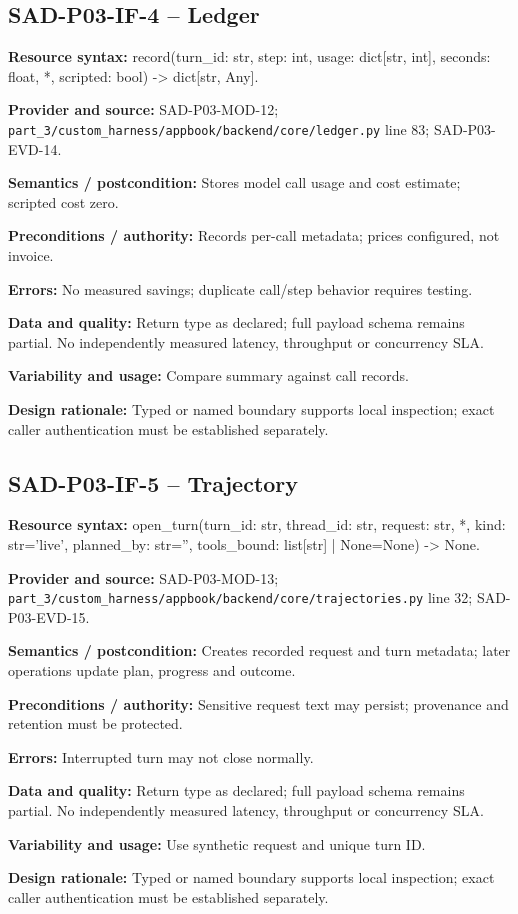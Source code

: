 \documentclass[10pt,letterpaper]{article}
\begin{document}
\subsection{SAD-P03-IF-4 -- Ledger}
{\raggedright \textbf{Resource syntax:} record(\allowbreak{}turn\_\allowbreak{}id: str, step: int, usage: dict[str, int], seconds: float, *, scripted: bool) -> dict[str, Any].\par}
\textbf{Provider and source:} SAD-P03-MOD-12; \nolinkurl{part_3/custom_harness/appbook/backend/core/ledger.py} line 83; SAD-P03-EVD-14.\par
\textbf{Semantics / postcondition:} Stores model call usage and cost estimate; scripted cost zero.\par
\textbf{Preconditions / authority:} Records per-call metadata; prices configured, not invoice.\par
\textbf{Errors:} No measured savings; duplicate call/step behavior requires testing.\par
\textbf{Data and quality:} Return type as declared; full payload schema remains partial. No independently measured latency, throughput or concurrency SLA.\par
\textbf{Variability and usage:} Compare summary against call records.\par
\textbf{Design rationale:} Typed or named boundary supports local inspection; exact caller authentication must be established separately.\par

\subsection{SAD-P03-IF-5 -- Trajectory}
{\raggedright \textbf{Resource syntax:} open\_\allowbreak{}turn(\allowbreak{}turn\_\allowbreak{}id: str, thread\_\allowbreak{}id: str, request: str, *, kind: str='live', planned\_\allowbreak{}by: str='', tools\_\allowbreak{}bound: list[str] | None=None) -> None.\par}
\textbf{Provider and source:} SAD-P03-MOD-13; \nolinkurl{part_3/custom_harness/appbook/backend/core/trajectories.py} line 32; SAD-P03-EVD-15.\par
\textbf{Semantics / postcondition:} Creates recorded request and turn metadata; later operations update plan, progress and outcome.\par
\textbf{Preconditions / authority:} Sensitive request text may persist; provenance and retention must be protected.\par
\textbf{Errors:} Interrupted turn may not close normally.\par
\textbf{Data and quality:} Return type as declared; full payload schema remains partial. No independently measured latency, throughput or concurrency SLA.\par
\textbf{Variability and usage:} Use synthetic request and unique turn ID.\par
\textbf{Design rationale:} Typed or named boundary supports local inspection; exact caller authentication must be established separately.\par
\end{document}
